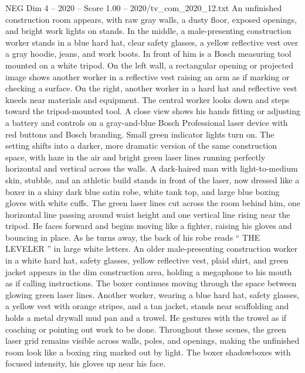 \begin{textsample}{NEG Dim 4 – 2020 – Score 1.00 – 2020/tv\_com\_2020\_12.txt}  \label{ex:f4_neg_086}
An unfinished construction room appears, with raw gray walls, a dusty floor, exposed openings, and bright work lights on stands.
In the middle, a male-presenting construction worker stands in a blue hard hat, clear safety glasses, a yellow reflective vest over a gray hoodie, jeans, and work boots.
In front of him is a Bosch measuring tool mounted on a white tripod.
On the left wall, a rectangular opening or projected image shows another worker in a reflective vest raising an arm as if marking or checking a surface.
On the right, another worker in a hard hat and reflective vest kneels near materials and equipment.
The central worker looks down and steps toward the tripod-mounted tool.
A close view shows his hands fitting or adjusting a battery and controls on a gray-and-blue Bosch Professional laser device with red buttons and Bosch branding.
Small green indicator lights turn on.
The setting shifts into a darker, more dramatic version of the same construction space, with haze in the air and bright green laser lines running perfectly horizontal and vertical across the walls.
A dark-haired man with light-to-medium skin, stubble, and an athletic build stands in front of the laser, now dressed like a boxer in a shiny dark blue satin robe, white tank top, and large blue boxing gloves with white cuffs.
The green laser lines cut across the room behind him, one horizontal line passing around waist height and one vertical line rising near the tripod.
He faces forward and begins moving like a fighter, raising his gloves and bouncing in place.
As he turns away, the back of his robe reads “ THE LEVELER ” in large white letters.
An older male-presenting construction worker in a white hard hat, safety glasses, yellow reflective vest, plaid shirt, and green jacket appears in the dim construction area, holding a megaphone to his mouth as if calling instructions.
The boxer continues moving through the space between glowing green laser lines.
Another worker, wearing a blue hard hat, safety glasses, a yellow vest with orange stripes, and a tan jacket, stands near scaffolding and holds a metal drywall mud pan and a trowel.
He gestures with the trowel as if coaching or pointing out work to be done.
Throughout these scenes, the green laser grid remains visible across walls, poles, and openings, making the unfinished room look like a boxing ring marked out by light.
The boxer shadowboxes with focused intensity, his gloves up near his face.

\end{textsample}
